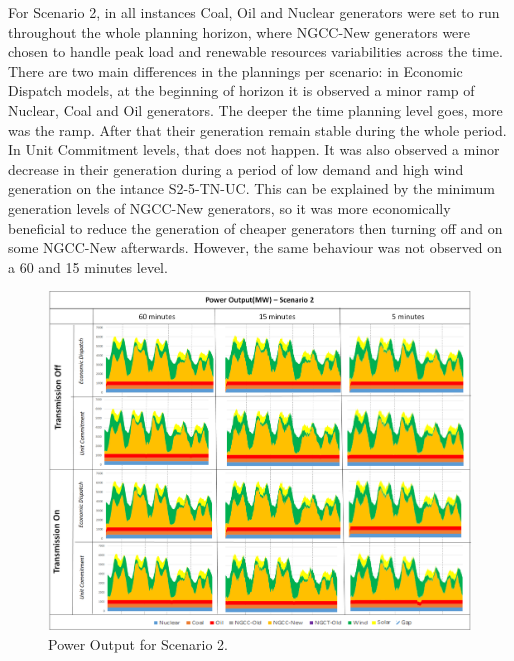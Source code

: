 \documentclass[12pt,LUDisStyle,twosided]{book}
\begin{document}
For Scenario 2, in all instances Coal, Oil and Nuclear generators were set to run throughout the whole planning horizon, where NGCC-New generators were chosen to handle peak load and renewable resources variabilities across the time. There are two main differences in the plannings per scenario: in Economic Dispatch models, at the beginning of horizon it is observed a minor ramp of Nuclear, Coal and Oil generators. The deeper the time planning level goes, more was the ramp. After that their generation remain stable during the whole period. In Unit Commitment levels, that does not happen. It was also observed a minor decrease in their generation during a period of low demand and high wind generation on the intance S2-5-TN-UC. This can be explained by the minimum generation levels of NGCC-New generators, so it was more economically beneficial to reduce the generation of cheaper generators then turning off and on some NGCC-New afterwards. However, the same behaviour was not observed on a 60 and 15 minutes level.


\begin{figure}[H] 
  \centering
	  \includegraphics[width=\textwidth,height=\textheight,keepaspectratio]{PowerOutputScenario2.png}
  \caption{Power Output for Scenario 2.}
  \label{fig:powerOutputScenario2}
\end{figure}
\end{document}
